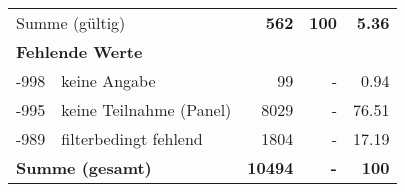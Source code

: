 \begin{longtable}{lXrrr}
     \midrule
     \multicolumn{2}{l}{Summe (gültig)} &
       \textbf{\num{562}} &
     \textbf{\num{100}} &
       \textbf{\num[round-mode=places,round-precision=2]{5.36}} \\
     \multicolumn{5}{l}{\textbf{Fehlende Werte}}\\
       -998 &
       keine Angabe &
         \num{99} &
        - &
         \num[round-mode=places,round-precision=2]{0.94} \\
       -995 &
       keine Teilnahme (Panel) &
         \num{8029} &
        - &
         \num[round-mode=places,round-precision=2]{76.51} \\
       -989 &
       filterbedingt fehlend &
         \num{1804} &
        - &
         \num[round-mode=places,round-precision=2]{17.19} \\
     \midrule
     \multicolumn{2}{l}{\textbf{Summe (gesamt)}} &
          \textbf{\num{10494}} &
        \textbf{-} &
        \textbf{\num{100}} \\
     \bottomrule
     \end{longtable}
     
